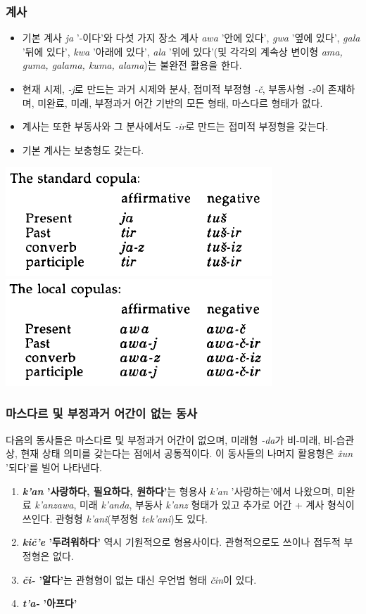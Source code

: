 \subsubsection{계사}
\begin{itemize}
	\item 기본 계사 \textit{ja} '-이다'와 다섯 가지 장소 계사 \textit{awa} '안에 있다', \textit{gwa} '옆에 있다', \textit{gala} '뒤에 있다', \textit{kwa} '아래에 있다', \textit{ala} '위에 있다'(및 각각의 계속상 변이형 \textit{ama, guma, galama, kuma, alama})는 불완전 활용을 한다.
	\item 현재 시제, \textit{-j}로 만드는 과거 시제와 분사, 접미적 부정형 \textit{-č}, 부동사형 \textit{-z}이 존재하며, 미완료, 미래, 부정과거 어간 기반의 모든 형태, 마스다르 형태가 없다.
	\item 계사는 또한 부동사와 그 분사에서도 \textit{-ir}로 만드는 접미적 부정형을 갖는다.
	\item 기본 계사는 보충형도 갖는다.
\end{itemize}
\begin{center}
\includegraphics{Lezgian/src/stco.png}
\includegraphics{Lezgian/src/loco.png}
\end{center}
\subsubsection{마스다르 및 부정과거 어간이 없는 동사}
다음의 동사들은 마스다르 및 부정과거 어간이 없으며, 미래형 \textit{-da}가 비-미래, 비-습관상, 현재 상태 의미를 갖는다는 점에서 공통적이다. 이 동사들의 나머지 활용형은 \textit{x̂un} '되다'를 빌어 나타낸다.
\begin{enumerate}
	\item \textbf{\textit{k'an} '사랑하다, 필요하다, 원하다'}는 형용사 \textit{k'an} '사랑하는'에서 나왔으며, 미완료 \textit{k'anzawa}, 미래 \textit{k'anda}, 부동사 \textit{k'anz} 형태가 있고 추가로 어간 + 계사 형식이 쓰인다. 관형형 \textit{k'ani}(부정형 \textit{tek'ani})도 있다.
	\item \textbf{\textit{kič'e} '두려워하다'} 역시 기원적으로 형용사이다. 관형적으로도 쓰이나 접두적 부정형은 없다.
	\item \textbf{\textit{či-} '알다'}는 관형형이 없는 대신 우언법 형태 \textit{čin}이 있다.
	\item \textbf{\textit{t'a-} '아프다'}
\end{enumerate}
